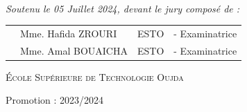\begin{center}
\begin{minipage}{0.4\textwidth}
\vspace{1cm}

\end{minipage}\\[0.6cm]

{\large \textit{Soutenu le 05 Juillet 2024, devant le jury composé de : }}\\[0.5cm]


\begin{tabular}{p{1cm}lll}
 & \large Mme. Hafida \textsc{ZROURI}  & \large ESTO & \large - Examinatrice \mbox{\hspace{2.2em}}\\[0.1cm]
 & \large Mme. Amal \textsc{BOUAICHA}  & \large ESTO & \large - Examinatrice \\[0.1cm]
 
\end{tabular}

\vspace{1.5cm}


\textsc{École Supérieure de Technologie Oujda}

{\large Promotion : 2023/2024}
   
\end{center}


